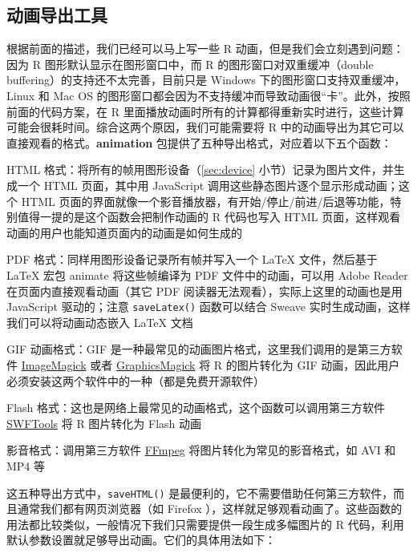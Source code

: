 \documentclass[
  b5paper,
  UTF8,twoside]{book}
\providecommand{\tightlist}{%
  \setlength{\itemsep}{0pt}\setlength{\parskip}{0pt}}
\begin{document}
\subsection{动画导出工具}\label{ux52a8ux753bux5bfcux51faux5de5ux5177}

根据前面的描述，我们已经可以马上写一些 R 动画，但是我们会立刻遇到问题：因为 R 图形默认显示在图形窗口中，而 R 的图形窗口对双重缓冲（double buffering）的支持还不太完善，目前只是 Windows 下的图形窗口支持双重缓冲，Linux 和 Mac OS 的图形窗口都会因为不支持缓冲而导致动画很``卡''。此外，按照前面的代码方案，在 R 里面播放动画时所有的计算都得重新实时进行，这些计算可能会很耗时间。综合这两个原因，我们可能需要将 R 中的动画导出为其它可以直接观看的格式。\textbf{animation} 包提供了五种导出格式，对应着以下五个函数：

\begin{description}
\tightlist
\item[\texttt{saveHTML()}]
HTML 格式：将所有的帧用图形设备（\ref{sec:device} 小节）记录为图片文件，并生成一个 HTML 页面，其中用 JavaScript 调用这些静态图片逐个显示形成动画；这个 HTML 页面的界面就像一个影音播放器，有开始/停止/前进/后退等功能，特别值得一提的是这个函数会把制作动画的 R 代码也写入 HTML 页面，这样观看动画的用户也能知道页面内的动画是如何生成的
\item[\texttt{saveLatex()}]
PDF 格式：同样用图形设备记录所有帧并写入一个 LaTeX 文件，然后基于 LaTeX 宏包 animate 将这些帧编译为 PDF 文件中的动画，可以用 Adobe Reader 在页面内直接观看动画（其它 PDF 阅读器无法观看），实际上这里的动画也是用 JavaScript 驱动的；注意 \texttt{saveLatex()} 函数可以结合 Sweave 实时生成动画，这样我们可以将动画动态嵌入 LaTeX 文档
\item[\texttt{saveGIF()}]
GIF 动画格式：GIF 是一种最常见的动画图片格式，这里我们调用的是第三方软件 \href{https://imagemagick.org/}{ImageMagick} 或者 \href{http://www.graphicsmagick.org}{GraphicsMagick} 将 R 的图片转化为 GIF 动画，因此用户必须安装这两个软件中的一种（都是免费开源软件）
\item[\texttt{saveSWF()}]
Flash 格式：这也是网络上最常见的动画格式，这个函数可以调用第三方软件 \href{http://swftools.org}{SWFTools} 将 R 图片转化为 Flash 动画
\item[\texttt{saveVideo()}]
影音格式：调用第三方软件 \href{https://ffmpeg.org/}{FFmpeg} 将图片转化为常见的影音格式，如 AVI 和 MP4 等
\end{description}

这五种导出方式中，\texttt{saveHTML()} 是最便利的，它不需要借助任何第三方软件，而且通常我们都有网页浏览器（如 Firefox ），这样就足够观看动画了。这些函数的用法都比较类似，一般情况下我们只需要提供一段生成多幅图片的 R 代码，利用默认参数设置就足够导出动画。它们的具体用法如下：
\end{document}
